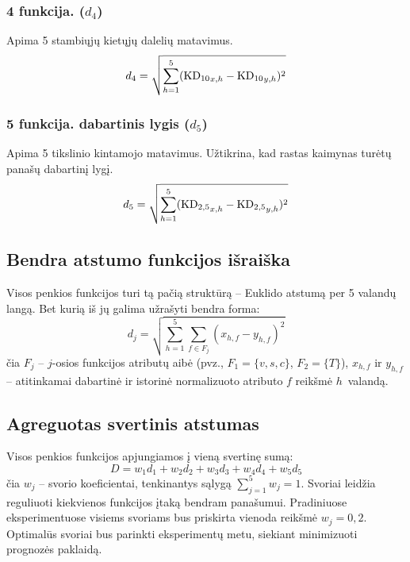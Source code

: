 \documentclass[]{VUMIFTemplateClass}
\begin{document}
    \subsubsection*{4 funkcija.  ($d_4$)}
    Apima 5 stambiųjų kietųjų dalelių  matavimus.
    \begin{equation}
        d_4 = \sqrt{\sum_{h=1}^{5} ({\ce{KD_{10}}}_{x,h} - {\ce{KD_{10}}}_{y,h})^2}
    \end{equation}

    \subsubsection*{5 funkcija.  dabartinis lygis ($d_5$)}
    Apima 5 tikslinio kintamojo  matavimus.
    Užtikrina, kad rastas kaimynas turėtų panašų dabartinį  lygį.
    \begin{equation}
        d_5 = \sqrt{\sum_{h=1}^{5} ({\ce{KD_{2,5}}}_{x,h} - {\ce{KD_{2,5}}}_{y,h})^2}
    \end{equation}

    \subsection{Bendra atstumo funkcijos išraiška}

    Visos penkios funkcijos turi tą pačią struktūrą -- Euklido atstumą per 5 valandų langą.
    Bet kurią iš jų galima užrašyti bendra forma:
    \begin{equation}
        d_j = \sqrt{\sum_{h=1}^{5} \sum_{f \in F_j} (x_{h,f} - y_{h,f})^2}
        \label{eq:dist_group}
    \end{equation}
    čia $F_j$ -- $j$-osios funkcijos atributų aibė (pvz., $F_1 = \{v, s, c\}$, $F_2 = \{T\}$), $x_{h,f}$ ir $y_{h,f}$ -- atitinkamai dabartinė ir istorinė normalizuoto atributo $f$ reikšmė $h$~valandą.

    \subsection{Agreguotas svertinis atstumas}

    Visos penkios funkcijos apjungiamos į vieną svertinę sumą:
    \begin{equation}
        D = w_1 d_1 + w_2 d_2 + w_3 d_3 + w_4 d_4 + w_5 d_5
        \label{eq:total_dist}
    \end{equation}
    čia $w_j$ -- svorio koeficientai, tenkinantys sąlygą $\sum_{j=1}^{5} w_j = 1$.
    Svoriai leidžia reguliuoti kiekvienos funkcijos įtaką bendram panašumui.
    Pradiniuose eksperimentuose visiems svoriams bus priskirta vienoda reikšmė $w_j = 0{,}2$.
    Optimalūs svoriai bus parinkti eksperimentų metu, siekiant minimizuoti prognozės paklaidą.
\end{document}
